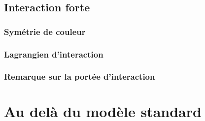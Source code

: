 \documentclass{article}
\begin{document}
			\subsection{Interaction forte}
				\subsubsection{Symétrie de couleur}
				\subsubsection{Lagrangien d'interaction}
				\subsubsection{Remarque sur la portée d'interaction}
		
		
		
		\section{Au delà du modèle standard}
		
\end{document}
